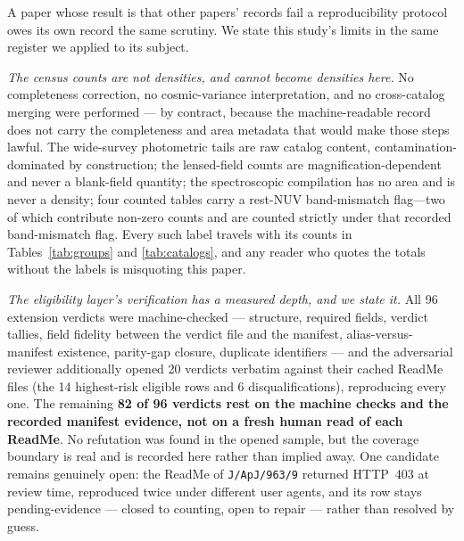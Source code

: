 \documentclass[twocolumn]{aastex702}
\begin{document}
A paper whose result is that other papers' records fail a reproducibility protocol owes
its own record the same scrutiny. We state this study's limits in the same register we
applied to its subject.

\emph{The census counts are not densities, and cannot become densities here.} No
completeness correction, no cosmic-variance interpretation, and no cross-catalog merging
were performed --- by contract, because the machine-readable record does not carry the
completeness and area metadata that would make those steps lawful. The wide-survey
photometric tails are raw catalog content, contamination-dominated by construction; the
lensed-field counts are magnification-dependent and never a blank-field quantity; the
spectroscopic compilation has no area and is never a density; four counted tables carry a rest-NUV band-mismatch flag---two of which
contribute non-zero counts and are counted strictly under that recorded band-mismatch
flag. Every such label travels with its counts in Tables~\ref{tab:groups} and
\ref{tab:catalogs}, and any reader who quotes the totals without the labels is misquoting
this paper.

\emph{The eligibility layer's verification has a measured depth, and we state it.} All
96 extension verdicts were machine-checked --- structure, required fields, verdict
tallies, field fidelity between the verdict file and the manifest, alias-versus-manifest
existence, parity-gap closure, duplicate identifiers --- and the adversarial reviewer
additionally opened 20 verdicts verbatim against their cached ReadMe files (the 14
highest-risk eligible rows and 6 disqualifications), reproducing every one. The
remaining \textbf{82 of 96 verdicts rest on the machine checks and the recorded
manifest evidence, not on a fresh human read of each ReadMe}. No refutation was found in
the opened sample, but the coverage boundary is real and is recorded here rather than
implied away. One candidate remains genuinely open: the ReadMe of \texttt{J/ApJ/963/9}
returned HTTP~403 at review time, reproduced twice under different user agents, and its
row stays pending-evidence --- closed to counting, open to repair --- rather than
resolved by guess.
\end{document}
